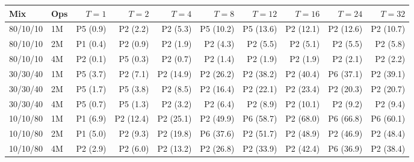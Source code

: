 \begin{tabular}{llrrrrrrrr}
\toprule
Mix & Ops & $T{=}1$ & $T{=}2$ & $T{=}4$ & $T{=}8$ & $T{=}12$ & $T{=}16$ & $T{=}24$ & $T{=}32$ \\
\midrule
80/10/10 & 1M & P5 (0.9) & P2 (2.2) & P2 (5.3) & P5 (10.2) & P5 (13.6) & P2 (12.1) & P2 (12.6) & P2 (10.7) \\
80/10/10 & 2M & P1 (0.4) & P2 (0.9) & P2 (1.9) & P2 (4.3) & P2 (5.5) & P2 (5.1) & P2 (5.5) & P2 (5.8) \\
80/10/10 & 4M & P2 (0.1) & P5 (0.3) & P2 (0.7) & P2 (1.4) & P2 (1.9) & P2 (1.9) & P2 (2.1) & P2 (2.2) \\
\midrule
30/30/40 & 1M & P5 (3.7) & P2 (7.1) & P2 (14.9) & P2 (26.2) & P2 (38.2) & P2 (40.4) & P6 (37.1) & P2 (39.1) \\
30/30/40 & 2M & P5 (1.7) & P5 (3.8) & P2 (8.5) & P2 (16.4) & P2 (22.1) & P2 (23.4) & P2 (20.3) & P2 (20.7) \\
30/30/40 & 4M & P5 (0.7) & P5 (1.3) & P2 (3.2) & P2 (6.4) & P2 (8.9) & P2 (10.1) & P2 (9.2) & P2 (9.4) \\
\midrule
10/10/80 & 1M & P1 (6.9) & P2 (12.4) & P2 (25.1) & P2 (49.9) & P6 (58.7) & P2 (68.0) & P6 (66.8) & P6 (60.1) \\
10/10/80 & 2M & P1 (5.0) & P2 (9.3) & P2 (19.8) & P6 (37.6) & P2 (51.7) & P2 (48.9) & P2 (46.9) & P2 (48.4) \\
10/10/80 & 4M & P2 (2.9) & P2 (6.0) & P2 (13.2) & P2 (26.8) & P2 (33.9) & P2 (42.4) & P6 (36.9) & P2 (38.4) \\
\bottomrule
\end{tabular}
